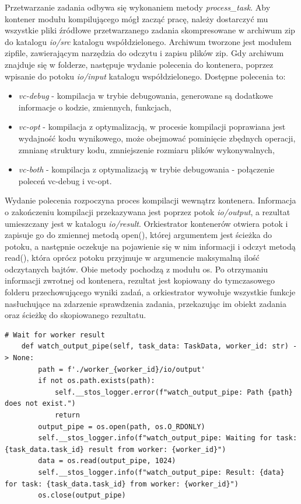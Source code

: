Przetwarzanie zadania odbywa się wykonaniem metody \textit{process\_task}. Aby kontener modułu kompilującego mógł zacząć pracę, należy dostarczyć mu wszystkie pliki źródłowe przetwarzanego zadania skompresowane w archiwum zip do katalogu \textit{io/src} katalogu współdzielonego. Archiwum tworzone jest modułem zipfile\cite{pythonZipfile}, zawierającym narzędzia do odczytu i zapisu plików zip. Gdy archiwum znajduje się w folderze, następuje wydanie polecenia do kontenera, poprzez wpisanie do potoku \textit{io/input} katalogu współdzielonego. Dostępne polecenia to:
\begin{itemize}
    \item \textit{vc-debug} - kompilacja w trybie debugowania, generowane są dodatkowe informacje o kodzie, zmiennych, funkcjach,
    \item \textit{vc-opt} - kompilacja z optymalizacją, w procesie kompilacji poprawiana jest wydajność kodu wynikowego, może obejmować pominięcie zbędnych operacji, zmnianę struktury kodu, zmniejszenie rozmiaru plików wykonywalnych,
    \item \textit{vc-both} - kompilacja z optymalizacją w trybie debugowania - połączenie poleceń vc-debug i vc-opt.
\end{itemize}
Wydanie polecenia rozpoczyna proces kompilacji wewnątrz kontenera. Informacja o zakończeniu kompilacji przekazywana jest poprzez potok \textit{io/output}, a rezultat umieszczany jest w katalogu \textit{io/result}. Orkiestrator kontenerów otwiera potok i zapisuje go do zmiennej metodą open(), której argumentem jest ścieżka do potoku, a następnie oczekuje na pojawienie się w nim informacji i odczyt metodą read(), która oprócz potoku przyjmuje w argumencie maksymalną ilość odczytanych bajtów. Obie metody pochodzą z modułu os\cite{pytohnOs}. Po otrzymaniu informacji zwrotnej od kontenera, rezultat jest kopiowany do tymczasowego folderu przechowującego wyniki zadań, a orkiestrator wywołuje wszystkie funkcje nasłuchujące na zdarzenie sprawdzenia zadania, przekazując im obiekt zadania oraz ścieżkę do skopiowanego rezultatu.

\lstset{style=python}
\begin{lstlisting}[caption = {Implementacja metody odczytującej informacje z potoku.}]
    # Wait for worker result 
    def watch_output_pipe(self, task_data: TaskData, worker_id: str) -> None:
        path = f'./worker_{worker_id}/io/output'
        if not os.path.exists(path):
            self.__stos_logger.error(f"watch_output_pipe: Path {path} does not exist.")
            return
        output_pipe = os.open(path, os.O_RDONLY)
        self.__stos_logger.info(f"watch_output_pipe: Waiting for task: {task_data.task_id} result from worker: {worker_id}")
        data = os.read(output_pipe, 1024)
        self.__stos_logger.info(f"watch_output_pipe: Result: {data} for task: {task_data.task_id} from worker: {worker_id}")
        os.close(output_pipe)
\end{lstlisting}

